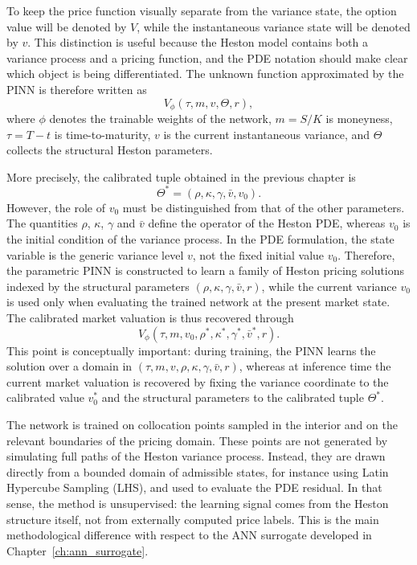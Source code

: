 To keep the price function visually separate from the variance state, the option value will be denoted by $V$, while the instantaneous variance state will be denoted by $v$. This distinction is useful because the Heston model contains both a variance process and a pricing function, and the PDE notation should make clear which object is being differentiated. The unknown function approximated by the PINN is therefore written as
\[
V_\phi(\tau,m,v,\Theta,r),
\]
where $\phi$ denotes the trainable weights of the network, $m=S/K$ is moneyness, $\tau=T-t$ is time-to-maturity, $v$ is the current instantaneous variance, and $\Theta$ collects the structural Heston parameters.

More precisely, the calibrated tuple obtained in the previous chapter is
\[
\Theta^*=(\rho,\kappa,\gamma,\bar v,v_0).
\]
However, the role of $v_0$ must be distinguished from that of the other parameters. The quantities $\rho$, $\kappa$, $\gamma$ and $\bar v$ define the operator of the Heston PDE, whereas $v_0$ is the initial condition of the variance process. In the PDE formulation, the state variable is the generic variance level $v$, not the fixed initial value $v_0$. Therefore, the parametric PINN is constructed to learn a family of Heston pricing solutions indexed by the structural parameters $(\rho,\kappa,\gamma,\bar v,r)$, while the current variance $v_0$ is used only when evaluating the trained network at the present market state. The calibrated market valuation is thus recovered through
\[
V_\phi(\tau,m,v_0,\rho^*,\kappa^*,\gamma^*,\bar v^*,r).
\]
This point is conceptually important: during training, the PINN learns the solution over a domain in $(\tau,m,v,\rho,\kappa,\gamma,\bar v,r)$, whereas at inference time the current market valuation is recovered by fixing the variance coordinate to the calibrated value $v_0^*$ and the structural parameters to the calibrated tuple $\Theta^*$.

The network is trained on collocation points sampled in the interior and on the relevant boundaries of the pricing domain. These points are not generated by simulating full paths of the Heston variance process. Instead, they are drawn directly from a bounded domain of admissible states, for instance using Latin Hypercube Sampling (LHS), and used to evaluate the PDE residual. In that sense, the method is unsupervised: the learning signal comes from the Heston structure itself, not from externally computed price labels. This is the main methodological difference with respect to the ANN surrogate developed in Chapter~\ref{ch:ann_surrogate}.

